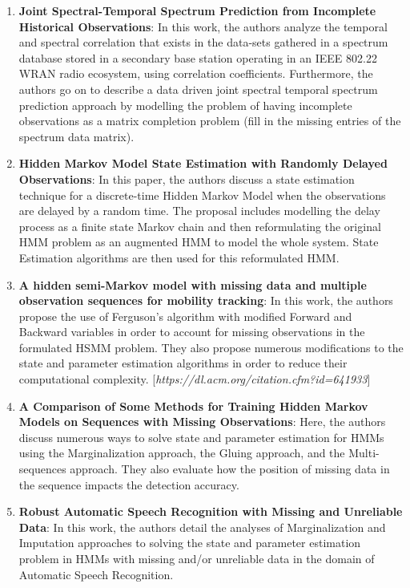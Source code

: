 \documentclass[12pt, draftcls, onecolumn]{IEEEtran}
\begin{document}
\begin{enumerate}
    \item \textbf{Joint Spectral-Temporal Spectrum Prediction from Incomplete Historical Observations}: In this work, the authors analyze the temporal and spectral correlation that exists in the data-sets gathered in a spectrum database stored in a secondary base station operating in an IEEE 802.22 WRAN radio ecosystem, using correlation coefficients. Furthermore, the authors go on to describe a data driven joint spectral temporal spectrum prediction approach by modelling the problem of having incomplete observations as a matrix completion problem (fill in the missing entries of the spectrum data matrix).
    \item \textbf{Hidden Markov Model State Estimation with Randomly Delayed Observations}: In this paper, the authors discuss a state estimation technique for a discrete-time Hidden Markov Model when the observations are delayed by a random time. The proposal includes modelling the delay process as a finite state Markov chain and then reformulating the original HMM problem as an augmented HMM to model the whole system. State Estimation algorithms are then used for this reformulated HMM.
    \item \textbf{A hidden semi-Markov model with missing data and multiple observation sequences for mobility tracking}: In this work, the authors propose the use of Ferguson's algorithm with modified Forward and Backward variables in order to account for missing observations in the formulated HSMM problem. They also propose numerous modifications to the state and parameter estimation algorithms in order to reduce their computational complexity.
    [\textit{https://dl.acm.org/citation.cfm?id=641933}]
    \item \textbf{A Comparison of Some Methods for Training Hidden Markov Models on Sequences with Missing Observations}: Here, the authors discuss numerous ways to solve state and parameter estimation for HMMs using the Marginalization approach, the Gluing approach, and the Multi-sequences approach. They also evaluate how the position of missing data in the sequence impacts the detection accuracy.
    \item \textbf{Robust Automatic Speech Recognition with Missing and Unreliable Data}: In this work, the authors detail the analyses of Marginalization and Imputation approaches to solving the state and parameter estimation problem in HMMs with missing and/or unreliable data in the domain of Automatic Speech Recognition.\newline

\end{enumerate}
\end{document}
